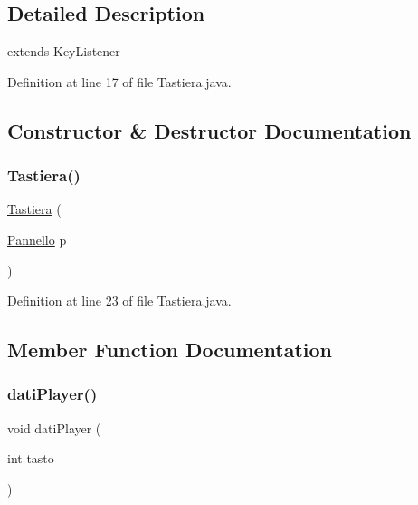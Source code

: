 \subsection{Detailed Description}
extends Key\+Listener 

Definition at line 17 of file Tastiera.\+java.



\subsection{Constructor \& Destructor Documentation}
\mbox{\label{classa_1_1survival_1_1game_1_1_tastiera_a300aa761b68ebe65b1c03dd49483e2bd}} 
\subsubsection{\texorpdfstring{Tastiera()}{Tastiera()}}
{\footnotesize\ttfamily \hyperlink{classa_1_1survival_1_1game_1_1_tastiera}{Tastiera} (\begin{DoxyParamCaption}\item[{\hyperlink{classa_1_1survival_1_1game_1_1_pannello}{Pannello}}]{p }\end{DoxyParamCaption})}



Definition at line 23 of file Tastiera.\+java.



\subsection{Member Function Documentation}
\mbox{\label{classa_1_1survival_1_1game_1_1_tastiera_afdd8d3c804439a86dbe018e7b23878f1}} 
\subsubsection{\texorpdfstring{dati\+Player()}{datiPlayer()}}
{\footnotesize\ttfamily void dati\+Player (\begin{DoxyParamCaption}\item[{int}]{tasto }\end{DoxyParamCaption})}



